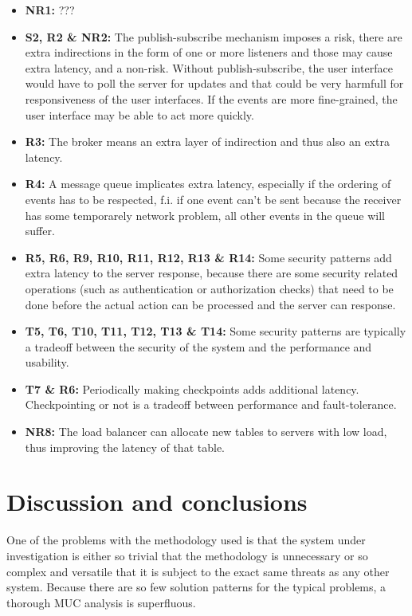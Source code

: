 \documentclass[a4paper,11pt]{report}
\begin{document}
\begin{itemize}
\item \textbf{NR1:} ???
\item \textbf{S2, R2 \& NR2:} The publish-subscribe mechanism imposes a risk, there are extra indirections in the
form of one or more listeners and those may cause extra latency, and a non-risk. Without publish-subscribe, the user
interface would have to poll the server for updates and that could be very harmfull for responsiveness of the
user interfaces. If the events are more fine-grained, the user interface may be able to act more quickly.
\item \textbf{R3:} The broker means an extra layer of indirection and thus also an extra latency.
\item \textbf{R4:} A message queue implicates extra latency, especially if the ordering of events has to
be respected, f.i. if one event can't be sent because the receiver has some temporarely network problem, all other
events in the queue will suffer.
\item \textbf{R5, R6, R9, R10, R11, R12, R13 \& R14:} Some security patterns add extra latency to the server response, because there are some security
related operations (such as authentication or authorization checks) that need to be done before the actual action
can be processed and the server can response.
\item \textbf{T5, T6, T10, T11, T12, T13 \& T14:} Some security patterns are typically a tradeoff between the security of the system and the
performance and usability.
\item \textbf{T7 \& R6:} Periodically making checkpoints adds additional latency. Checkpointing or not is a tradeoff
between performance and fault-tolerance.
\item \textbf{NR8:} The load balancer can allocate new tables to servers with low load, thus improving
the latency of that table.
\end{itemize}
\chapter{Discussion and conclusions}

One of the problems with the methodology used is that the system under investigation is either so trivial that the methodology is unnecessary or so complex and versatile that it is subject to the exact same threats as any other system. Because there are so few solution patterns for the typical problems, a thorough MUC analysis is superfluous.
\end{document}
